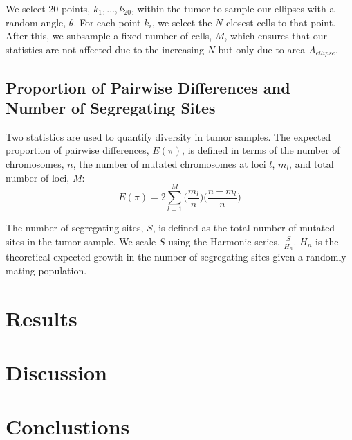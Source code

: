 \documentclass[12pt]{article}
\begin{document}
We select 20 points, $k_1,\ldots,k_{20}$, within the tumor to sample our ellipses with a random angle, $\theta$. For each point $k_i$, we select the $N$ closest cells to that point. After this, we subsample a fixed number of cells, $M$, which ensures that our statistics are not affected due to the increasing $N$ but only due to area $A_{ellipse}$.

\subsection{Proportion of Pairwise Differences and Number of Segregating Sites}
Two statistics are used to quantify diversity in tumor samples. The expected proportion of pairwise differences, $E(\pi)$, is defined in terms of the number of chromosomes, $n$, the number of mutated chromosomes at loci $l$, $m_l$, and total number of loci, $M$:
\begin{equation} \label{eq:Epi}
	E(\pi) = 2\sum_{l=1}^M \Big(\frac{m_l}{n}\Big) \Big( \frac{n-m_l}{n}\Big) 
\end{equation}

The number of segregating sites, $S$, is defined as the total number of mutated sites in the tumor sample. We scale $S$ using the Harmonic series, $\frac{S}{H_n}$. $H_n$ is the theoretical expected growth in the number of segregating sites given a randomly mating population.


% 
% 
\section{Results}




% 
% 
\section{Discussion}




% 
% 
\section{Conclustions}


\newpage


\end{document}
